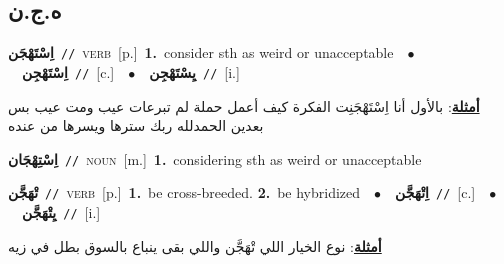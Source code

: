 \documentclass[10pt,a4paper,twoside]{article} %
\begin{document}
\begin{multicols}{2}
\vspace{-3mm}
\subsection*{\color{blue}\foreignlanguage{arabic}{ه.ج.ن}\color{blue}{}} 

{\setlength\topsep{0pt}\textbf{\foreignlanguage{arabic}{اِسْتَهْجَن}}\ {\color{gray}\texttt{//}\color{black}}\ \textsc{verb}\ [p.]\ \textbf{1.}~consider sth as weird or unacceptable\ \ $\bullet$\ \ \setlength\topsep{0pt}\textbf{\foreignlanguage{arabic}{اِسْتَهْجِن}}\ {\color{gray}\texttt{//}\color{black}}\ [c.]\ \ $\bullet$\ \ \setlength\topsep{0pt}\textbf{\foreignlanguage{arabic}{يِسْتَهْجِن}}\ {\color{gray}\texttt{//}\color{black}}\ [i.]\  \begin{flushright}\color{gray}\foreignlanguage{arabic}{\textbf{\underline{\foreignlanguage{arabic}{أمثلة}}}: بالأول أنا اِسْتَهْجَنِت الفكرة كيف أعمل حملة لم تبرعات عيب ومت عيب بس بعدين الحمدلله ربك سترها ويسرها من عنده}\end{flushright}\color{black}} \vspace{2mm}

{\setlength\topsep{0pt}\textbf{\foreignlanguage{arabic}{اِسْتِهْجَان}}\ {\color{gray}\texttt{//}\color{black}}\ \textsc{noun}\ [m.]\ \textbf{1.}~considering sth as weird or unacceptable\ } \vspace{2mm}

{\setlength\topsep{0pt}\textbf{\foreignlanguage{arabic}{تْهَجَّن}}\ {\color{gray}\texttt{//}\color{black}}\ \textsc{verb}\ [p.]\ \textbf{1.}~be cross-breeded.  \textbf{2.}~be hybridized\ \ $\bullet$\ \ \setlength\topsep{0pt}\textbf{\foreignlanguage{arabic}{اِتْهَجَّن}}\ {\color{gray}\texttt{//}\color{black}}\ [c.]\ \ $\bullet$\ \ \setlength\topsep{0pt}\textbf{\foreignlanguage{arabic}{يِتْهَجَّن}}\ {\color{gray}\texttt{//}\color{black}}\ [i.]\  \begin{flushright}\color{gray}\foreignlanguage{arabic}{\textbf{\underline{\foreignlanguage{arabic}{أمثلة}}}: نوع الخيار اللي تْهَجَّن واللي بقى ينباع بالسوق بطل في زيه}\end{flushright}\color{black}} \vspace{2mm}


\end{multicols}
\end{document}
